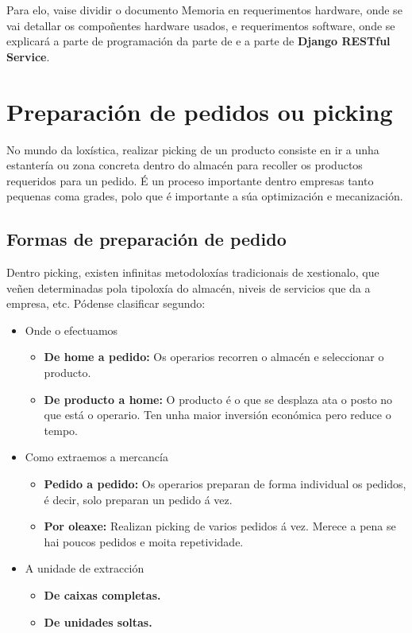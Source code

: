\documentclass[11pt,twoside]{book}
\begin{document}
Para elo, vaise dividir o documento Memoria en requerimentos hardware, onde se vai detallar os compoñentes hardware usados, e requerimentos software, onde se explicará a parte de programación da parte de  e a parte de \textbf{Django RESTful Service}.

\chapter{Preparación de pedidos ou picking}

No mundo da loxística, realizar picking de un producto consiste en ir a unha estantería ou zona concreta dentro do almacén para recoller os productos requeridos para un pedido. É un proceso importante dentro empresas tanto pequenas coma grades, polo que é importante a súa optimización e mecanización.

\section{Formas de preparación de pedido}
Dentro picking, existen infinitas metodoloxías tradicionais de xestionalo, que veñen determinadas pola tipoloxía do almacén, niveis de servicios que da a empresa, etc. 
Pódense clasificar segundo:

\begin{itemize}
    \item Onde o efectuamos
        \begin{itemize}
            \item \textbf{De home a pedido:} Os operarios recorren o almacén e seleccionar o producto. 
            \item \textbf{De producto a home:} O producto é o que se desplaza ata o posto no que está o operario. Ten unha maior inversión económica pero reduce o tempo.
        \end{itemize}
    \item Como extraemos a mercancía
        \begin{itemize}
            \item \textbf{Pedido a pedido: } Os operarios preparan de forma individual os pedidos, é decir, solo preparan un pedido á vez. 
            \item \textbf{Por oleaxe: } Realizan picking de varios pedidos á vez. Merece a pena se hai poucos pedidos e moita repetividade. 
        \end{itemize}
    \item A unidade de extracción
        \begin{itemize}
            \item \textbf{De caixas completas.}
            \item \textbf{De unidades soltas.}
        \end{itemize}
\end{itemize}
\end{document}
